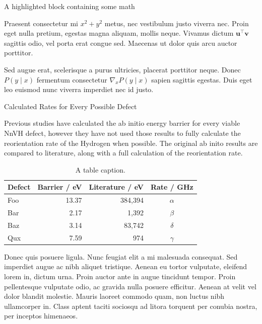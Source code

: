 \documentclass[final]{beamer}
\newlength{\colwidth}
\begin{document}
\begin{frame}[t]
\begin{columns}[t]
\begin{column}{\colwidth}
\begin{exampleblock}{A highlighted block containing some math}

    Praesent consectetur mi $x^2 + y^2$ metus, nec vestibulum justo viverra
    nec. Proin eget nulla pretium, egestas magna aliquam, mollis neque. Vivamus
    dictum $\mathbf{u}^\intercal\mathbf{v}$ sagittis odio, vel porta erat
    congue sed. Maecenas ut dolor quis arcu auctor porttitor.


    Sed augue erat, scelerisque a purus ultricies, placerat porttitor neque.
    Donec $P(y \mid x)$ fermentum consectetur $\nabla_x P(y \mid x)$ sapien
    sagittis egestas. Duis eget leo euismod nunc viverra imperdiet nec id
    justo.

  \end{exampleblock}

  \begin{block}{Calculated Rates for Every Possible Defect}

    Previous studies have calculated the ab initio energy barrier for every viable NnVH defect, however they have not used those results to fully calculate the reorientation rate of the Hydrogen when possible. The original ab inito results are compared to literature, along with a full calculation of the reorientation rate.

    \begin{table}
      \centering
      \begin{tabular}{l r r c}
        \toprule
        \textbf{Defect} & \textbf{Barrier / eV} & \textbf{Literature / eV} & \textbf{Rate / GHz} \\
        \midrule
        Foo & 13.37 & 384,394 & $\alpha$ \\
        Bar & 2.17 & 1,392 & $\beta$ \\
        Baz & 3.14 & 83,742 & $\delta$ \\
        Qux & 7.59 & 974 & $\gamma$ \\
        \bottomrule
      \end{tabular}
      \caption{A table caption.}
    \end{table}

    Donec quis posuere ligula. Nunc feugiat elit a mi malesuada consequat. Sed
    imperdiet augue ac nibh aliquet tristique. Aenean eu tortor vulputate,
    eleifend lorem in, dictum urna. Proin auctor ante in augue tincidunt
    tempor. Proin pellentesque vulputate odio, ac gravida nulla posuere
    efficitur. Aenean at velit vel dolor blandit molestie. Mauris laoreet
    commodo quam, non luctus nibh ullamcorper in. Class aptent taciti sociosqu
    ad litora torquent per conubia nostra, per inceptos himenaeos.


\end{block}
\end{column}
\end{columns}
\end{frame}
\end{document}
